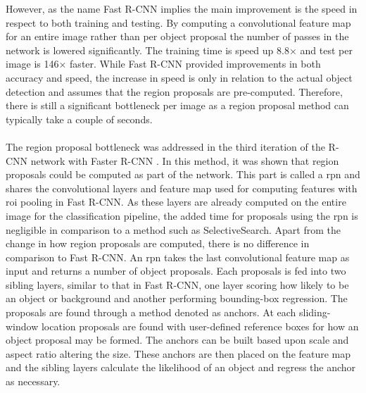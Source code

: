 However, as the name Fast R-CNN implies the main improvement is the speed in respect to both training and testing. By computing a convolutional feature map for an entire image rather than per object proposal the number of passes in the network is lowered significantly. The training time is speed up 8.8$\times$ and test per image is 146$\times$ faster. While Fast R-CNN provided improvements in both accuracy and speed, the increase in speed is only in relation to the actual object detection and assumes that the region proposals are pre-computed. Therefore, there is still a significant bottleneck per image as a region proposal method can typically take a couple of seconds. 
\\\\
The region proposal bottleneck was addressed in the third iteration of the R-CNN network with Faster R-CNN \cite{fasterrcnn}. In this method, it was shown that region proposals could be computed as part of the network. This part is called a \gls{rpn} and shares the convolutional layers and feature map used for computing features with \gls{roi} pooling in Fast R-CNN. As these layers are already computed on the entire image for the classification pipeline, the added time for proposals using the \gls{rpn} is negligible in comparison to a method such as SelectiveSearch. Apart from the change in how region proposals are computed, there is no difference in comparison to Fast R-CNN. 
An \gls{rpn} takes the last convolutional feature map as input and returns a number of object proposals. Each proposals is fed into two sibling layers, similar to that in Fast R-CNN, one layer scoring how likely to be an object or background and another performing bounding-box regression. The proposals are found through a method denoted as anchors. At each sliding-window location proposals are found with user-defined reference boxes for how an object proposal may be formed. The anchors can be built based upon scale and aspect ratio altering the size. These anchors are then placed on the feature map and the sibling layers calculate the likelihood of an object and regress the anchor as necessary.  
